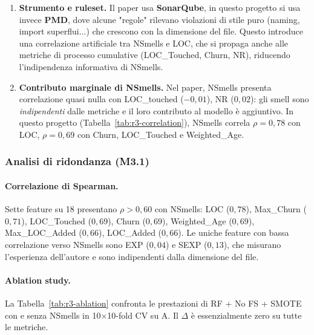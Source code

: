 \begin{enumerate}

\item \textbf{Strumento e ruleset.} Il paper usa \textbf{SonarQube}, in questo progetto si usa invece
\textbf{PMD}, dove alcune "regole" rilevano violazioni di stile puro
(naming, import superflui...) che crescono con la
dimensione del file. Questo introduce una correlazione artificiale tra NSmells e LOC, che
si propaga anche alle metriche di processo cumulative (LOC\_Touched, Churn, NR), riducendo
l'indipendenza informativa di NSmells.

\item \textbf{Contributo marginale di NSmells.} Nel paper, NSmells presenta correlazione
quasi nulla con LOC\_touched ($-0{,}01$), NR ($0{,}02$): gli smell sono \textit{indipendenti}
dalle metriche e il loro contributo al modello è aggiuntivo. In questo progetto
(Tabella~\ref{tab:r3-correlation}), NSmells correla $\rho = 0{,}78$ con LOC,
$\rho = 0{,}69$ con Churn, LOC\_Touched e Weighted\_Age.

\end{enumerate}

\subsubsection{Analisi di ridondanza (M3.1)}

\paragraph{Correlazione di Spearman.}
Sette feature su 18 presentano $\rho > 0{,}60$ con NSmells: LOC ($0{,}78$), Max\_Churn
($0{,}71$), LOC\_Touched ($0{,}69$), Churn ($0{,}69$), Weighted\_Age ($0{,}69$),
Max\_LOC\_Added ($0{,}66$), LOC\_Added ($0{,}66$). Le uniche feature con bassa correlazione verso NSmells
sono EXP ($0{,}04$) e SEXP ($0{,}13$), che misurano l'esperienza dell'autore e sono
indipendenti dalla dimensione del file.

\paragraph{Ablation study.}
La Tabella~\ref{tab:r3-ablation} confronta le prestazioni di RF + No FS + SMOTE con e
senza NSmells in 10$\times$10-fold CV su A. Il $\Delta$ è essenzialmente zero su tutte
le metriche.

